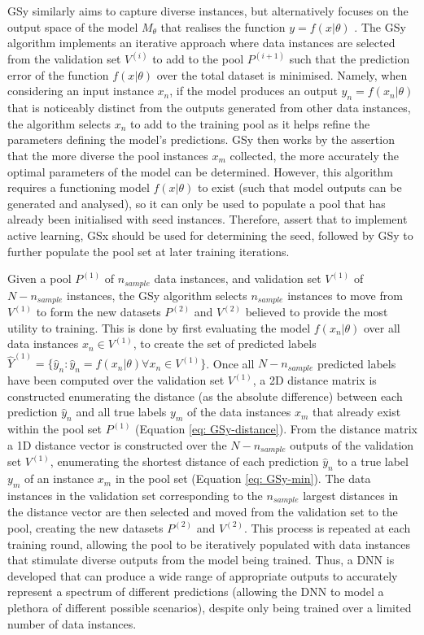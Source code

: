 \documentclass[a4paper, 11pt]{report}
\begin{document}
    GSy \citep{wu-2019} similarly aims to capture diverse instances, but alternatively focuses on the output space of the model $M_{\theta}$ that realises the function $y = f( x \vert \theta )$ \citep{wu-2019}. The GSy algorithm implements an iterative approach where data instances are selected from the validation set $V^{(i)}$ to add to the pool $P^{(i+1)}$ such that the prediction error of the function $f( x \vert \theta )$ over the total dataset is minimised. Namely, when considering an input instance $x_n$, if the model produces an output $y_n = f( x_n \vert \theta )$ that is noticeably distinct from the outputs generated from other data instances, the algorithm selects $x_n$ to add to the training pool as it helps refine the parameters defining the model's predictions. GSy then works by the assertion that the more diverse the pool instances $x_m$ collected, the more accurately the optimal parameters of the model can be determined. However, this algorithm requires a functioning model $f( x \vert \theta )$ to exist (such that model outputs can be generated and analysed), so it can only be used to populate a pool that has already been initialised with seed instances. Therefore, \citet{wu-2019} assert that to implement active learning, GSx should be used for determining the seed, followed by GSy to further populate the pool set at later training iterations.

    Given a pool $P^{(1)}$ of $n_{sample}$ data instances, and validation set $V^{(1)}$ of $N - n_{sample}$ instances, the GSy algorithm selects $n_{sample}$ instances to move from $V^{(1)}$ to form the new datasets $P^{(2)}$ and $V^{(2)}$ believed to provide the most utility to training. This is done by first evaluating the model $f( x_n \vert \theta )$ over all data instances $x_n \in V^{(1)}$, to create the set of predicted labels $\hat{Y}^{(1)} = \{ \hat{y}_n \colon \hat{y}_n = f( x_n \vert \theta ) \forall x_n \in V^{(1)} \}$. Once all $N - n_{sample}$ predicted labels have been computed over the validation set $V^{(1)}$, a 2D distance matrix is constructed enumerating the distance (as the absolute difference) between each prediction $\hat{y}_n$ and all true labels $y_m$ of the data instances $x_m$ that already exist within the pool set $P^{(1)}$ (Equation \ref{eq: GSy-distance}). From the distance matrix a 1D distance vector is constructed over the $N - n_{sample}$ outputs of the validation set $V^{(1)}$, enumerating the shortest distance of each prediction $\hat{y}_n$ to a true label $y_m$ of an instance $x_m$ in the pool set (Equation \ref{eq: GSy-min}). The data instances in the validation set corresponding to the $n_{sample}$ largest distances in the distance vector are then selected and moved from the validation set to the pool, creating the new datasets $P^{(2)}$ and $V^{(2)}$. This process is repeated at each training round, allowing the pool to be iteratively populated with data instances that stimulate diverse outputs from the model being trained. Thus, a DNN is developed that can produce a wide range of appropriate outputs to accurately represent a spectrum of different predictions (allowing the DNN to model a plethora of different possible scenarios), despite only being trained over a limited number of data instances.
\end{document}
